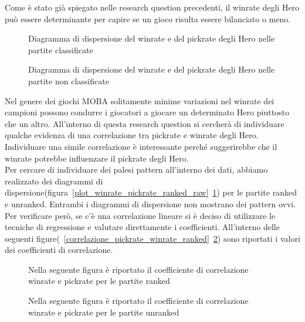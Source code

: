 Come è stato già spiegato nelle research question precedenti, il winrate degli Hero può essere determinante per capire se un gioco risulta essere bilanciato o meno. \\
\begin{figure}[htbp]
\begin{center}

\caption{Diagramma di dispersione del winrate e del pickrate degli Hero nelle partite classificate}
\label{plot_winrate_pickrate_ranked_raw}

\caption{Diagramma di dispersione del winrate e del pickrate degli Hero nelle partite non classificate}
\label{plot_winrate_pickrate_unranked_raw}
\end{center}
\end{figure}
Nel genere dei giochi MOBA solitamente minime variazioni nel winrate dei campioni possono condurre i giocatori a giocare un determinato Hero piuttosto che un altro. All'interno di questa research question si cercherà di individuare qualche evidenza di una correlazione tra pickrate e winrate degli Hero. Individuare una simile correlazione è interessante perché suggerirebbe che il winrate potrebbe influenzare il pickrate degli Hero. \\
Per cercare di individuare dei palesi pattern all'interno dei dati, abbiamo realizzato dei diagrammi di dispersione(figura~\ref{plot_winrate_pickrate_ranked_raw}~\ref{plot_winrate_pickrate_unranked_raw}) per le partite ranked e unranked. Entrambi i diagrammi di dispersione non mostrano dei pattern ovvi. Per verificare però, se c'è una correlazione lineare si è deciso di utilizzare le tecniche di regressione e valutare direttamente i coefficienti. All'interno delle seguenti figure(~\ref{correlazione_pickrate_winrate_ranked}~\ref{correlazione_pickrate_winrate_unranked}) sono riportati i valori dei coefficienti di correlazione.
\begin{figure}[htbp]
\centering
\begin{multicols}{2}
\hspace*{-0.15\linewidth}

\caption{Nella seguente figura è riportato il coefficiente di correlazione winrate e pickrate per le partite ranked}
\label{correlazione_pickrate_winrate_ranked}
\hspace*{-0.15\linewidth}

\caption{Nella seguente figura è riportato il coefficiente di correlazione winrate e pickrate per le partite unranked}
\label{correlazione_pickrate_winrate_unranked}
\end{multicols}
\end{figure}
